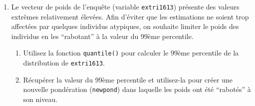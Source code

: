 \documentclass[12pt,twosided, notitlepage]{book}
\newenvironment{Shaded}{}{}
\newcommand{\KeywordTok}[1]{\textcolor[rgb]{0.00,0.00,1.00}{#1}}
\newcommand{\DataTypeTok}[1]{#1}
\newcommand{\FloatTok}[1]{#1}
\newcommand{\StringTok}[1]{\textcolor[rgb]{0.00,0.50,0.50}{#1}}
\newcommand{\CommentTok}[1]{\textcolor[rgb]{0.00,0.50,0.00}{#1}}
\newcommand{\OperatorTok}[1]{#1}
\newcommand{\NormalTok}[1]{#1}
\newif \ifsol
\renewenvironment{Shaded}{\begin{snugshade}}{\end{snugshade}}
\begin{document}
\begin{enumerate}
\begin{enumerate}
    \begin{center} \rule{0.5\linewidth}{\linethickness}\end{center}

    \bigskip  \fi 
  \end{enumerate}
\item
  Le vecteur de poids de l'enquête (variable \texttt{extri1613})
  présente des valeurs extrêmes relativement élevées. Afin d'éviter que
  les estimations ne soient trop affectées par quelques individus
  atypiques, on souhaite limiter le poids des individus en les
  \enquote{rabotant} à la valeur du 99ème percentile.

  \begin{enumerate}
  \def\labelenumii{\roman{enumii}.}
  \item
    Utilisez la fonction \texttt{quantile()} pour calculer le 99ème
    percentile de la distribution de
    \texttt{extri1613}.

    \ifsol 

    \begin{center} \rule{0.5\linewidth}{\linethickness}\end{center}

\begin{Shaded}
\begin{Highlighting}[]
\CommentTok{# La fonction quantile() calcule les quantiles d'une distribution}
\KeywordTok{quantile}\NormalTok{(eec}\OperatorTok{$}\NormalTok{extri1613)}
\NormalTok{  ##         0%
\NormalTok{  ##   156.3798  1088.2021  1334.5818  1636.7540 25347.1387}

\CommentTok{# Pour récupérer un quantile en particulier, on utilise l'argument}
\CommentTok{# probs }
\NormalTok{seuil <-}\StringTok{ }\KeywordTok{quantile}\NormalTok{(eec}\OperatorTok{$}\NormalTok{extri1613, }\DataTypeTok{probs =} \FloatTok{0.99}\NormalTok{)}
\NormalTok{seuil}
\NormalTok{  ##      99%
\NormalTok{  ## 3958.567}
\end{Highlighting}
\end{Shaded}

    \begin{center} \rule{0.5\linewidth}{\linethickness}\end{center}

    \bigskip  \fi 
  \item
    Récupérer la valeur du 99ème percentile et utilisez-la pour créer
    une nouvelle pondération (\texttt{newpond}) dans laquelle les poids
    ont été \enquote{rabotés} à son niveau.


\end{enumerate}
\end{enumerate}
\end{document}
